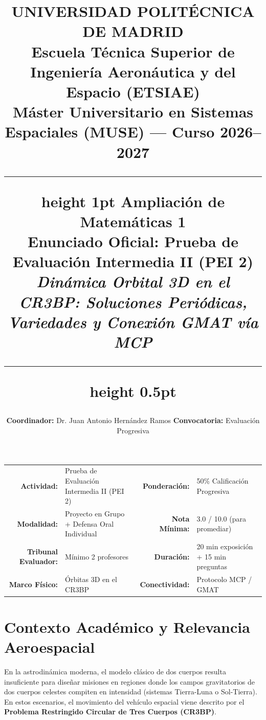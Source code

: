 \documentclass[11pt, a4paper]{article}
\title{\vspace{-1.5cm}\textbf{\LARGE UNIVERSIDAD POLITÉCNICA DE MADRID}\\[0.3em]
	\textbf{\large Escuela Técnica Superior de Ingeniería Aeronáutica y del Espacio (ETSIAE)}\\[0.2em]
	\textbf{\normalsize Máster Universitario en Sistemas Espaciales (MUSE) --- Curso 2026--2027}\\[0.5em]
	\hrule height 1pt \vspace{0.6em}
	\textbf{\Large Ampliación de Matemáticas 1 }\\[0.3em]
	\textbf{\large Enunciado Oficial: Prueba de Evaluación Intermedia II (PEI 2)}\\[0.2em]
	\textsl{Dinámica Orbital 3D en el CR3BP: Soluciones Periódicas, Variedades y Conexión GMAT vía MCP}\vspace{0.4em}
	\hrule height 0.5pt \vspace{-0.5em}}
\author{\textbf{Coordinador:} Dr. Juan Antonio Hernández Ramos \quad \quad 
	\textbf{Convocatoria:} 
	Evaluación Progresiva}
\date{}
\begin{document}
	
	\maketitle
	\begin{center}
		\small
		\begin{tabularx}{\textwidth}{rX rX}
			\toprule
			\textbf{Actividad:} & Prueba de Evaluación Intermedia II (PEI 2) & \textbf{Ponderación:} & 50\% Calificación Progresiva \\
			\textbf{Modalidad:} & Proyecto en Grupo + Defensa Oral Individual & \textbf{Nota Mínima:} & 3.0 / 10.0 (para promediar) \\
			\textbf{Tribunal Evaluador:} & Mínimo 2 profesores & \textbf{Duración:} & 20 min exposición + 15 min preguntas \\
			\textbf{Marco Físico:} & Órbitas 3D en el CR3BP & \textbf{Conectividad:} & 
			Protocolo MCP / GMAT  \\
			\bottomrule
		\end{tabularx}
	\end{center}
	
	\vspace{0.3em}
	
	\section{Contexto Académico y Relevancia Aeroespacial}
	
	En la astrodinámica moderna, el modelo clásico de dos cuerpos resulta insuficiente para diseñar misiones en regiones donde los campos gravitatorios de dos cuerpos celestes compiten en intensidad (sistemas Tierra-Luna o Sol-Tierra). En estos escenarios, el movimiento del vehículo espacial viene descrito por el \textbf{Problema Restringido Circular de Tres Cuerpos (CR3BP)}.
	
\end{document}
